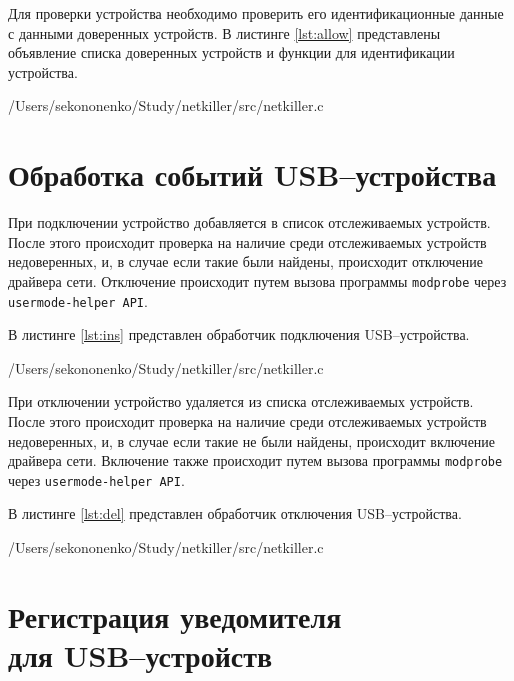 Для проверки устройства необходимо проверить его идентификационные данные с данными доверенных устройств. В листинге \ref{lst:allow} представлены объявление списка доверенных устройств и функции для идентификации устройства.

\begin{lstinputlisting}[
	caption={Функции для идентификации устройств},
	label={lst:allow},
	style={c},
	linerange={16-18, 22-80},
	]{/Users/sekononenko/Study/netkiller/src/netkiller.c}
\end{lstinputlisting}

\section{Обработка событий USB--устройства}

При подключении устройство добавляется в список отслеживаемых устройств. После этого происходит проверка на наличие среди отслеживаемых устройств недоверенных, и, в случае если такие были найдены, происходит отключение драйвера сети. Отключение происходит путем вызова программы \texttt{modprobe} через \texttt{usermode-helper API}.

В листинге \ref{lst:ins} представлен обработчик подключения USB--устройства.

\begin{lstinputlisting}[
	caption={Обработчик подключения USB--устройства},
	label={lst:ins},
	style={c},
	linerange={105-134},
	]{/Users/sekononenko/Study/netkiller/src/netkiller.c}
\end{lstinputlisting}

При отключении устройство удаляется из списка отслеживаемых устройств. После этого происходит проверка на наличие среди отслеживаемых устройств недоверенных, и, в случае если такие не были найдены, происходит включение драйвера сети. Включение также происходит путем вызова программы \texttt{modprobe} через \texttt{usermode-helper API}.

В листинге \ref{lst:del} представлен обработчик отключения USB--устройства.

\begin{lstinputlisting}[
	caption={Обработчик отключения USB--устройства},
	label={lst:del},
	style={c},
	linerange={137-166},
	]{/Users/sekononenko/Study/netkiller/src/netkiller.c}
\end{lstinputlisting}

\section{Регистрация уведомителя\\ для USB--устройств}

